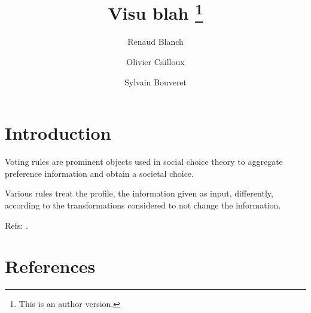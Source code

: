 \documentclass[version=last, pagesize, twoside=off, bibliography=totoc, DIV=calc, fontsize=12pt, a4paper, french, english]{scrartcl}
\begin{document}
\title{%
	\texorpdfstring{
		Visu blah%
		\thanks{
			This is an author version.
		}
	}{%
		Visu
	}
}
\author{Renaud Blanch}
\author{Olivier Cailloux}
\author{Sylvain Bouveret}
\maketitle

\section{Introduction}
\label{sec:intro}
Voting rules are prominent objects used in social choice theory to aggregate preference information and obtain a societal choice.

Various rules treat the profile, the information given as input, differently, according to the transformations considered to not change the information.

Refs: \citet{sen_social_1986, sen_informational_1974, sen_weights_1977, blackorby_social_1984}.

\section{References}

\end{document}
